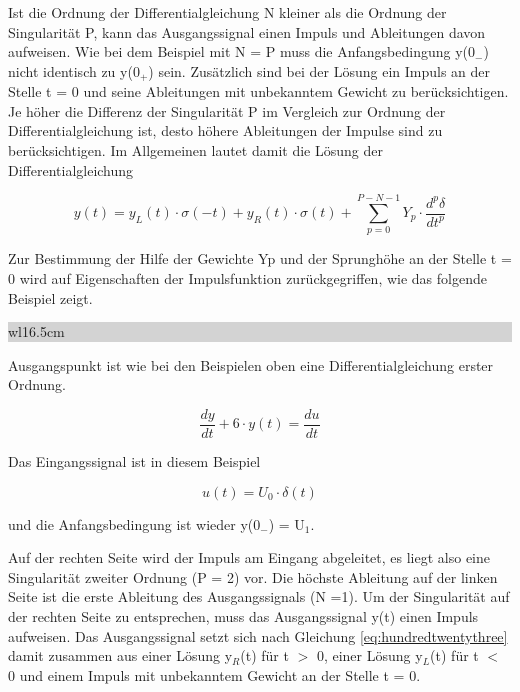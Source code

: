 \noindent Ist die Ordnung der Differentialgleichung N kleiner als die Ordnung der Singularit\"{a}t P, kann das Ausgangssignal einen Impuls und Ableitungen davon aufweisen. Wie bei dem Beispiel mit N = P muss die Anfangsbedingung y(0${}_{-}$) nicht identisch zu y(0${}_{+}$) sein. Zus\"{a}tzlich sind bei der L\"{o}sung ein Impuls an der Stelle t = 0 und seine Ableitungen mit unbekanntem Gewicht zu ber\"{u}cksichtigen. Je h\"{o}her die Differenz der Singularit\"{a}t P im Vergleich zur Ordnung der Differentialgleichung ist, desto h\"{o}here Ableitungen der Impulse sind zu ber\"{u}cksichtigen. Im Allgemeinen lautet damit die L\"{o}sung der Differentialgleichung

\begin{equation}\label{eq:hundredtwentythree}
y\left(t\right)=y_{L} \left(t\right)\cdot \sigma \left(-t\right)+y_{R} \left(t\right)\cdot \sigma \left(t\right)+\sum _{p=0}^{P-N-1}Y_{p} \cdot \frac{d^{p} \delta }{dt^{p}} 
\end{equation}

\noindent Zur Bestimmung der Hilfe der Gewichte Yp und der Sprungh\"{o}he an der Stelle t = 0 wird auf Eigenschaften der Impulsfunktion zur\"{u}ckgegriffen, wie das folgende Beispiel zeigt.\bigskip

\noindent
\colorbox{lightgray}{%
%
\renewcommand\arraystretch{0.6}%
\begin{tabular}{ wl{16.5cm} }
{\selectfont{
Beispiel: Lineare Differentialgleichung und stetiges Ausgangssignal}}
\end{tabular}%
}\bigskip

\noindent Ausgangspunkt ist wie bei den Beispielen oben eine Differentialgleichung erster Ordnung.

\begin{equation}\label{eq:hundredtwentyfour}
\frac{dy}{dt} +6\cdot y\left(t\right)=\frac{du}{dt}
\end{equation}

\noindent Das Eingangssignal ist in diesem Beispiel

\begin{equation}\label{eq:hundredtwentyfive}
u\left(t\right)=U_{0} \cdot \delta \left(t\right)
\end{equation}

\noindent und die Anfangsbedingung ist wieder y(0${}_{-}$) = U${}_{1}$. 

\noindent Auf der rechten Seite wird der Impuls am Eingang abgeleitet, es liegt also eine Singularit\"{a}t zweiter Ordnung (P = 2) vor. Die h\"{o}chste Ableitung auf der linken Seite ist die erste Ableitung des Ausgangssignals (N =1). Um der Singularit\"{a}t auf der rechten Seite zu entsprechen, muss das Ausgangssignal y(t) einen Impuls aufweisen. Das Ausgangssignal setzt sich nach Gleichung \eqref{eq:hundredtwentythree} damit zusammen aus einer L\"{o}sung y${}_{R}$(t) f\"{u}r t $\mathrm{>}$ 0, einer L\"{o}sung y${}_{L}$(t) f\"{u}r t $\mathrm{<}$ 0 und einem Impuls mit unbekanntem Gewicht an der Stelle t = 0.

